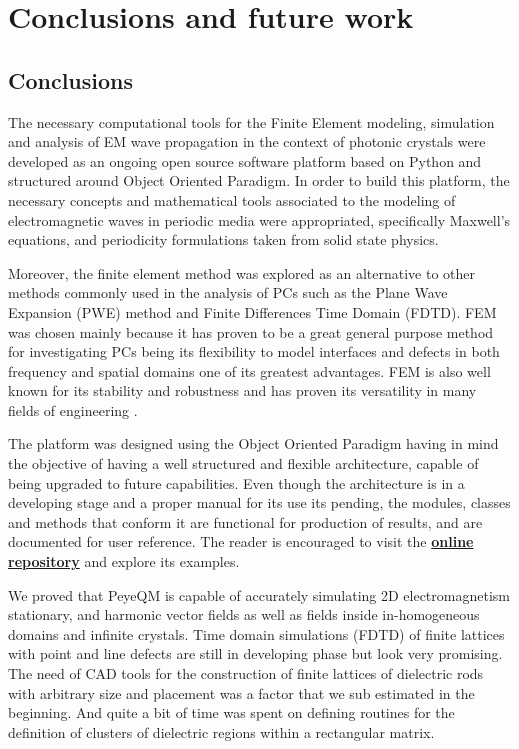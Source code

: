 \chapter{Conclusions and future work}

\section{Conclusions}

The necessary computational tools for the Finite Element modeling, simulation and analysis of EM wave propagation in the context of photonic crystals were developed as an ongoing open source software platform based on Python and structured around Object Oriented Paradigm. 
In order to build this platform, the necessary concepts and mathematical tools associated to the modeling of electromagnetic waves in periodic media were appropriated, specifically Maxwell's equations, and periodicity formulations taken from solid state physics. 

Moreover, the finite element method was explored as an alternative to other methods commonly used in the analysis of PCs such as the Plane Wave Expansion (PWE) \cite{StevenJohnson2001} method and Finite Differences Time Domain (FDTD)\cite{Oskooi2009}. FEM was chosen mainly because it has proven to be a great general purpose method for investigating PCs \cite{Andonegui2013} being its flexibility to model interfaces and defects in both frequency and spatial domains one of its greatest advantages. FEM is also well known for its stability and robustness and has proven its versatility in many fields of engineering \cite{Bathe1996, Ram2002, Zienkiewicz2005, Logg2012}.

The platform was designed using the Object Oriented Paradigm having in mind the objective of having a well structured and flexible architecture, capable of being upgraded to future capabilities. Even though the architecture is in a developing stage and a proper manual for its use its pending, the modules, classes and methods that conform it are functional for production of results, and are documented for user reference. The reader is encouraged to visit the \href{https://github.com/bebopsan/peyeQM/tree/Depuration}{\textbf{online repository}}  and explore its examples.

We proved that PeyeQM is capable of accurately simulating  2D electromagnetism stationary, and harmonic vector fields as well as fields inside in-homogeneous domains and infinite crystals. Time domain simulations (FDTD) of finite lattices with point and line defects are still in developing phase but look very promising. The need of CAD tools for the construction of finite lattices of dielectric rods with arbitrary size and placement was a factor that we sub estimated in the beginning. And quite a bit of time was spent on defining routines for the definition of clusters of  dielectric regions within a rectangular matrix.      

